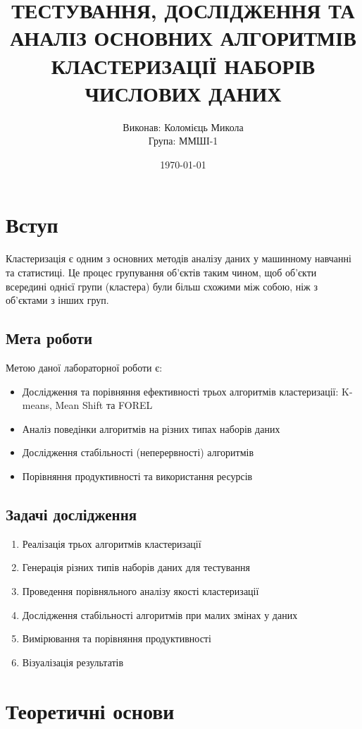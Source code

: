 \documentclass[12pt,a4paper]{article}
\title{\textbf{ТЕСТУВАННЯ, ДОСЛІДЖЕННЯ ТА АНАЛІЗ ОСНОВНИХ АЛГОРИТМІВ КЛАСТЕРИЗАЦІЇ НАБОРІВ ЧИСЛОВИХ ДАНИХ}}
\author{Виконав: Коломієць Микола\\
Група: ММШІ-1}
\date{\today}
\begin{document}
\maketitle

\tableofcontents
\newpage

\section{Вступ}

Кластеризація є одним з основних методів аналізу даних у машинному навчанні та статистиці. Це процес групування об'єктів таким чином, щоб об'єкти всередині однієї групи (кластера) були більш схожими між собою, ніж з об'єктами з інших груп.

\subsection{Мета роботи}
Метою даної лабораторної роботи є:
\begin{itemize}
    \item Дослідження та порівняння ефективності трьох алгоритмів кластеризації: K-means, Mean Shift та FOREL
    \item Аналіз поведінки алгоритмів на різних типах наборів даних
    \item Дослідження стабільності (неперервності) алгоритмів
    \item Порівняння продуктивності та використання ресурсів
\end{itemize}

\subsection{Задачі дослідження}
\begin{enumerate}
    \item Реалізація трьох алгоритмів кластеризації
    \item Генерація різних типів наборів даних для тестування
    \item Проведення порівняльного аналізу якості кластеризації
    \item Дослідження стабільності алгоритмів при малих змінах у даних
    \item Вимірювання та порівняння продуктивності
    \item Візуалізація результатів
\end{enumerate}

\section{Теоретичні основи}
\end{document}
